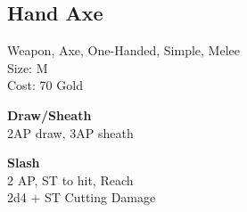 \subsection{Hand Axe}\label{weapon:handAxe}
Weapon, Axe, One-Handed, Simple, Melee\\
Size: M\\
Cost: 70 Gold

\textbf{Draw/Sheath}\\
2AP draw, 3AP sheath

\textbf{Slash}\\
2 AP, ST to hit,  Reach\\
2d4 + \texttimes ST Cutting Damage

